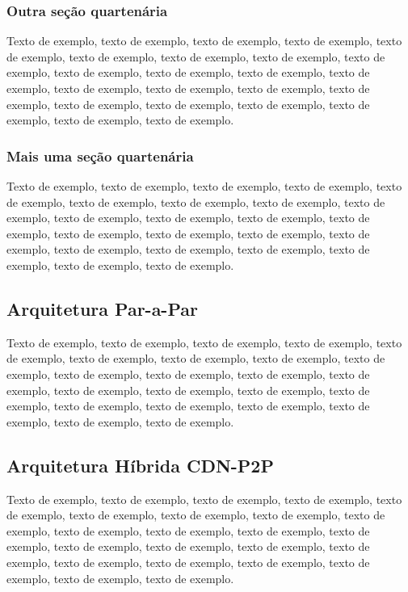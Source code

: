 \documentclass[
	12pt,				%
	oneside,			%
	a4paper,			%
	english,			%
	brazil				%
	]{abntex2ppgsi}
\begin{document}
\subsubsection{Outra seção quartenária}

Texto de exemplo, texto de exemplo, texto de exemplo, texto de exemplo, texto de exemplo, texto de exemplo, texto de exemplo, texto de exemplo, texto de exemplo, texto de exemplo, texto de exemplo, texto de exemplo, texto de exemplo, texto de exemplo, texto de exemplo, texto de exemplo, texto de exemplo, texto de exemplo, texto de exemplo, texto de exemplo, texto de exemplo, texto de exemplo, texto de exemplo.

\subsubsection{Mais uma seção quartenária}

Texto de exemplo, texto de exemplo, texto de exemplo, texto de exemplo, texto de exemplo, texto de exemplo, texto de exemplo, texto de exemplo, texto de exemplo, texto de exemplo, texto de exemplo, texto de exemplo, texto de exemplo, texto de exemplo, texto de exemplo, texto de exemplo, texto de exemplo, texto de exemplo, texto de exemplo, texto de exemplo, texto de exemplo, texto de exemplo, texto de exemplo.

\subsection{Arquitetura Par-a-Par}

Texto de exemplo, texto de exemplo, texto de exemplo, texto de exemplo, texto de exemplo, texto de exemplo, texto de exemplo, texto de exemplo, texto de exemplo, texto de exemplo, texto de exemplo, texto de exemplo, texto de exemplo, texto de exemplo, texto de exemplo, texto de exemplo, texto de exemplo, texto de exemplo, texto de exemplo, texto de exemplo, texto de exemplo, texto de exemplo, texto de exemplo.

\subsection{Arquitetura Híbrida CDN-P2P}

Texto de exemplo, texto de exemplo, texto de exemplo, texto de exemplo, texto de exemplo, texto de exemplo, texto de exemplo, texto de exemplo, texto de exemplo, texto de exemplo, texto de exemplo, texto de exemplo, texto de exemplo, texto de exemplo, texto de exemplo, texto de exemplo, texto de exemplo, texto de exemplo, texto de exemplo, texto de exemplo, texto de exemplo, texto de exemplo, texto de exemplo.
\end{document}
